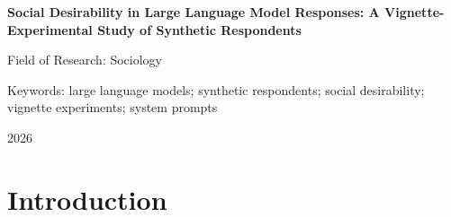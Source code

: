\documentclass[14pt,a4paper]{extarticle}
\newcommand{\snakebreak}{\renewcommand{\_}{\textunderscore\allowbreak}}
\begin{document}
\snakebreak

\hypersetup{pageanchor=false}
\begin{titlepage}
\begin{center}
\vspace*{3.0cm}
{\Large\bfseries Social Desirability in Large Language Model Responses:
A Vignette-Experimental Study of Synthetic Respondents\par}
\vspace{2.4cm}
{\normalsize Field of Research: Sociology\par}
\vspace{1.2cm}
{\normalsize Keywords: large language models; synthetic respondents;
social desirability; vignette experiments; system prompts\par}
\vfill
{\normalsize 2026\par}
\end{center}
\end{titlepage}
\hypersetup{pageanchor=true}

\tableofcontents
\clearpage

\begin{abstract}
We examine how system prompts affect large language models as synthetic respondents in four vignette experiments: coercive interrogation, charitable giving, energy conservation, and bribery. We compare responses with published human treatment effects and analyze final answers, verbalized reasoning, and exploratory hidden states. Replication of human effects is inconsistent across tasks and models. Anti-sanitization prompts sometimes produce large response shifts, whereas positive and negative research-consequence framing yields smaller, less consistent changes. Reasoning annotations shift with prompts and correlate with answers, but do not identify causal mechanisms. Moving responses away from socially approved positions does not reliably improve correspondence with human experimental effects.

The authors used AI to assist with code development, data analysis workflows, data markup and to improve the language and translation of the text. The authors reviewed and edited the output and take full responsibility for the content.
\end{abstract}

\section{Introduction}
\end{document}
